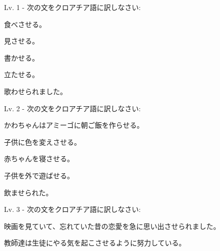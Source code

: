 
\author{Kristijan Čavić}

	
	\begin{mondai}{Lv. 1 - 次の文をクロアチア語に訳しなさい:}
		\item 食べさせる。
		\item 見させる。
		\item 書かせる。
		\item 立たせる。
		\item 歌わせられました。
	\end{mondai}
	
	\begin{mondai}{Lv. 2 - 次の文をクロアチア語に訳しなさい:}
		\item かわちゃんはアミーゴに朝ご飯を作らせる。
		\item 子供に色を変えさせる。
		\item 赤ちゃんを寝させる。
		\item 子供を外で遊ばせる。
		\item 飲ませられた。
	\end{mondai}
	
	\begin{mondai}{Lv. 3 - 次の文をクロアチア語に訳しなさい:}
		\item 映画を見ていて、忘れていた昔の恋愛を急に思い出させられました。
		\item 教師達は生徒にやる気を起こさせるように努力している。
	\end{mondai}
